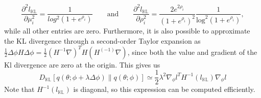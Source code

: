 \documentclass{article}
\begin{document}
	 \begin{equation}
	 \frac{\partial^2l_\mathds{KL}}{\partial\mu_i^2} = \frac{1}{log^2(1+e^{\rho_i})}\quad\quad\text{and}\quad\quad\frac{\partial^2l_\mathds{KL}}{\partial\rho_i^2} = \frac{2e^{2\rho_i}}{(1 + e^{\rho_i})^2}\frac{1}{\text{log}^2(1+e^{\rho_i})},
	 \end{equation}
	 while all other entries are zero. Furthermore, it is also possible to approximate the KL divergence through a second-order Taylor expansion as $\frac{1}{2}\Delta\phi H\Delta\phi=\frac{1}{2}(H^{-1}\nabla)^TH(H^(-1)\nabla)$, since both the value and gradient of the Kl divergence are zero at the origin. This gives us
	 \begin{equation}
	 D_\mathds{KL}[q(\theta;\phi + \lambda\Delta\phi)\|q(\theta;\phi)] \simeq \frac{1}{2}\lambda^2\nabla_\phi l^TH^{-1}(l_\mathds{KL})\nabla_\phi l
	 \end{equation}
	 Note that $H^{-1}(l_\mathds{KL})$ is diagonal, so this expression can be computed efficiently.
\end{document}
